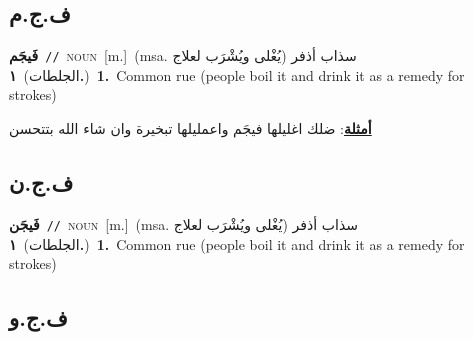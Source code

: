 \documentclass[10pt,a4paper,twoside]{article} %
\begin{document}
\begin{multicols}{2}
{{{{{{{{{{{{\vspace{-3mm}
\subsection*{\color{blue}\foreignlanguage{arabic}{ف.ج.م}\color{blue}{ (ntws)}} 

{\setlength\topsep{0pt}\textbf{\foreignlanguage{arabic}{فَيجَم}}\ {\color{gray}\texttt{//}\color{black}}\ \textsc{noun}\ [m.]\ \color{gray}(msa. \foreignlanguage{arabic}{سذاب أذفر (يُغْلى ويُشْرَب لعلاج الجلطات)}~\foreignlanguage{arabic}{\textbf{١.}})\color{black}\ \textbf{1.}~Common rue (people boil it and drink it as a remedy for strokes)\  \begin{flushright}\color{gray}\foreignlanguage{arabic}{\textbf{\underline{\foreignlanguage{arabic}{أمثلة}}}: ضلك اغليلها فيجَم واعمليلها تبخيرة وان شاء الله بتتحسن}\end{flushright}\color{black}} \vspace{2mm}

\vspace{-3mm}
\subsection*{\color{blue}\foreignlanguage{arabic}{ف.ج.ن}\color{blue}{ (ntws)}} 

{\setlength\topsep{0pt}\textbf{\foreignlanguage{arabic}{فَيجَن}}\ {\color{gray}\texttt{//}\color{black}}\ \textsc{noun}\ [m.]\ \color{gray}(msa. \foreignlanguage{arabic}{سذاب أذفر (يُغْلى ويُشْرَب لعلاج الجلطات)}~\foreignlanguage{arabic}{\textbf{١.}})\color{black}\ \textbf{1.}~Common rue (people boil it and drink it as a remedy for strokes)\ 

\vspace{-3mm}
\subsection*{\color{blue}\foreignlanguage{arabic}{ف.ج.و}\color{blue}{}} 

}}}}}}}}}}}}}
\end{multicols}
\end{document}
